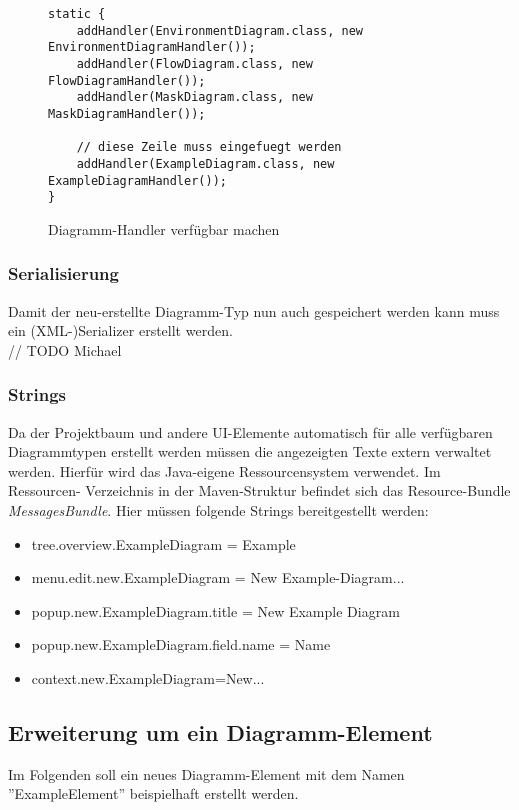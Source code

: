 \begin{figure}[h!]
	\centering
	\begin{lstlisting}
static {
    addHandler(EnvironmentDiagram.class, new EnvironmentDiagramHandler());
    addHandler(FlowDiagram.class, new FlowDiagramHandler());
    addHandler(MaskDiagram.class, new MaskDiagramHandler());
        
    // diese Zeile muss eingefuegt werden
    addHandler(ExampleDiagram.class, new ExampleDiagramHandler());
}
	\end{lstlisting}
	\label{diagram_handler}
	\caption{Diagramm-Handler verfügbar machen}
\end{figure}
\subsubsection{Serialisierung}
Damit der neu-erstellte Diagramm-Typ nun auch gespeichert werden kann muss ein (XML-)Serializer erstellt werden.
\\
// TODO Michael

\subsubsection{Strings}
Da der Projektbaum und andere UI-Elemente automatisch für alle verfügbaren Diagrammtypen erstellt werden müssen
die angezeigten Texte extern verwaltet werden. Hierfür wird das Java-eigene Ressourcensystem verwendet. Im Ressourcen-
Verzeichnis in der Maven-Struktur befindet sich das Resource-Bundle \textit{MessagesBundle}. Hier müssen folgende Strings
bereitgestellt werden:

\begin{itemize}
	\item tree.overview.ExampleDiagram = Example
	\item menu.edit.new.ExampleDiagram = New Example-Diagram...
	\item popup.new.ExampleDiagram.title = New Example Diagram
	\item popup.new.ExampleDiagram.field.name = Name
	\item context.new.ExampleDiagram=New...
\end{itemize}

\subsection{Erweiterung um ein Diagramm-Element}
\label{add_element}
Im Folgenden soll ein neues Diagramm-Element mit dem Namen ''ExampleElement'' beispielhaft erstellt werden.

